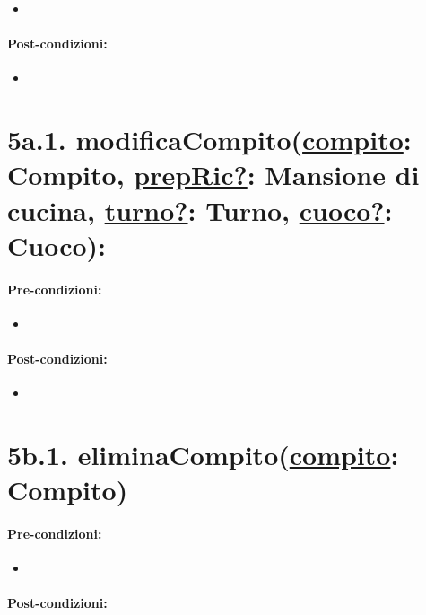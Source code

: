 \begin{itemize}
  \item 
\end{itemize}

\paragraph{Post-condizioni:}

\begin{itemize}
  \item 
\end{itemize}

\section*{5a.1. modificaCompito(\underline{compito}: Compito, \underline{prepRic?}: Mansione di cucina, \underline{turno?}: Turno, \underline{cuoco?}: Cuoco):}

\paragraph{Pre-condizioni:}

\begin{itemize}
  \item 
\end{itemize}

\paragraph{Post-condizioni:}

\begin{itemize}
  \item 
\end{itemize}

\section*{5b.1. eliminaCompito(\underline{compito}: Compito)}

\paragraph{Pre-condizioni:}

\begin{itemize}
  \item 
\end{itemize}

\paragraph{Post-condizioni:}

